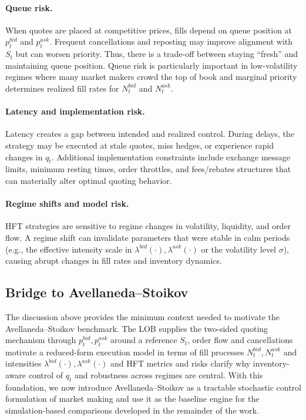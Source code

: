 \paragraph{Queue risk.}
When quotes are placed at competitive prices, fills depend on queue position at $p_t^{bid}$ and $p_t^{ask}$. Frequent cancellations and reposting may improve alignment with $S_t$ but can worsen priority. Thus, there is a trade-off between staying ``fresh'' and maintaining queue position. Queue risk is particularly important in low-volatility regimes where many market makers crowd the top of book and marginal priority determines realized fill rates for $N_t^{bid}$ and $N_t^{ask}$.

\paragraph{Latency and implementation risk.}
Latency creates a gap between intended and realized control. During delays, the strategy may be executed at stale quotes, miss hedges, or experience rapid changes in $q_t$. Additional implementation constraints include exchange message limits, minimum resting times, order throttles, and fees/rebates structures that can materially alter optimal quoting behavior.

\paragraph{Regime shifts and model risk.}
HFT strategies are sensitive to regime changes in volatility, liquidity, and order flow. A regime shift can invalidate parameters that were stable in calm periods (e.g., the effective intensity scale in $\lambda^{bid}(\cdot),\lambda^{ask}(\cdot)$ or the volatility level $\sigma$), causing abrupt changes in fill rates and inventory dynamics.

\subsection{Bridge to Avellaneda--Stoikov}
The discussion above provides the minimum context needed to motivate the Avellaneda--Stoikov benchmark. The LOB supplies the two-sided quoting mechanism through $p_t^{bid},p_t^{ask}$ around a reference $S_t$, order flow and cancellations motivate a reduced-form execution model in terms of fill processes $N_t^{bid},N_t^{ask}$ and intensities $\lambda^{bid}(\cdot),\lambda^{ask}(\cdot)$ and HFT metrics and risks clarify why inventory-aware control of $q_t$ and robustness across regimes are central. With this foundation, we now introduce Avellaneda--Stoikov as a tractable stochastic control formulation of market making and use it as the baseline engine for the simulation-based comparisons developed in the remainder of the work.

